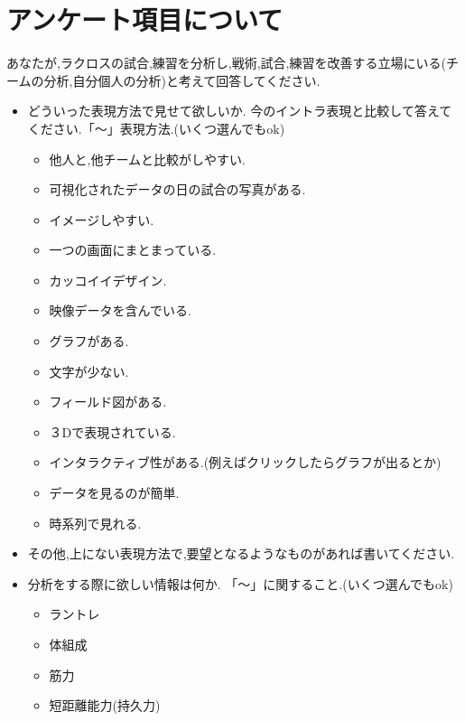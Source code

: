\documentclass[sotsuron]{kuee}
\begin{document}





\appendix
\chapter{アンケート項目について}
	あなたが,ラクロスの試合,練習を分析し,戦術,試合,練習を改善する立場にいる(チームの分析,自分個人の分析)と考えて回答してください.
	\begin{itemize}
		\item どういった表現方法で見せて欲しいか.
			今のイントラ表現と比較して答えてください.「〜」表現方法.(いくつ選んでもok)
			\begin{itemize}
				\item 他人と,他チームと比較がしやすい.
				\item 可視化されたデータの日の試合の写真がある.
				\item イメージしやすい.
				\item 一つの画面にまとまっている.
				\item カッコイイデザイン.
				\item 映像データを含んでいる.
				\item グラフがある.
				\item 文字が少ない.
				\item フィールド図がある.
				\item ３Dで表現されている.
				\item インタラクティブ性がある.(例えばクリックしたらグラフが出るとか)
				\item データを見るのが簡単.
				\item 時系列で見れる.
			\end{itemize}
		\item その他,上にない表現方法で,要望となるようなものがあれば書いてください.
		\item 分析をする際に欲しい情報は何か.
			「〜」に関すること.(いくつ選んでもok)
			\begin{itemize}
				\item ラントレ
				\item 体組成
				\item 筋力
				\item 短距離能力(持久力)

\end{itemize}
\end{itemize}
\end{document}
